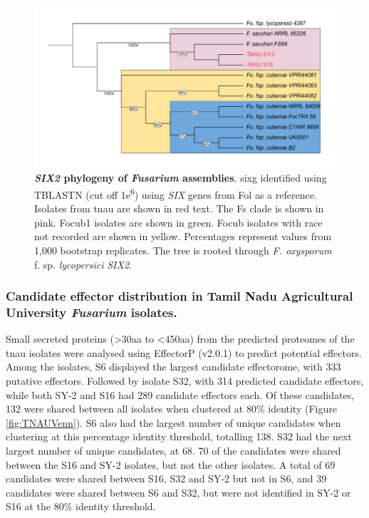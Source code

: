 \begin{figure}[htp!]
  \centering
  \includegraphics[width=15cm]{Figures/FusSIX2.Phylo.edited.pdf}
  \caption[\textit{SIX2} phylogeny of \textit{Fusarium} assemblies]{\textbf{\textit{SIX2} phylogeny of \textit{Fusarium} assemblies}. \acl{sixg} identified using TBLASTN (cut off 1\-e\textsuperscript{6}) using \textit{SIX} genes from \acl{Fol} as a reference. Isolates from \ac{tnau} are shown in red text. The \acl{Fs} clade is shown in pink. \Acl{Focub1} isolates are shown in green. \acl{Focub} isolates with race not recorded are shown in yellow. Percentages represent values from 1,000 bootstrap replicates. The tree is rooted through \textit{F. oxysporum} f. sp. \textit{lycopersici} \textit{SIX2}.}
  \label{fig:FusSIX2}
\end{figure}

\subsubsection{Candidate effector distribution in Tamil Nadu Agricultural University \textit{Fusarium} isolates.}

Small secreted proteins (>30aa to <450aa)  from the predicted proteomes of the \ac{tnau} isolates were analysed using EffectorP (v2.0.1) to predict potential effectors. Among the isolates, S6 displayed the largest candidate effectorome, with 333 putative effectors. Followed by isolate S32, with 314 predicted candidate effectors, while both SY-2 and S16 had 289 candidate effectors each. Of these candidates, 132 were shared between all isolates when clustered at 80\% identity (Figure \ref{fig:TNAUVenn}). S6 also had the largest number of unique candidates when clustering at this percentage identity threshold, totalling 138. S32 had the next largest number of unique candidates, at 68. 70 of the candidates were shared between the S16 and SY-2 isolates, but not the other isolates. A total of 69 candidates were shared between S16, S32 and SY-2 but  not  in S6, and 39 candidates were shared between S6 and S32, but were not identified in SY-2 or S16 at the  80\% identity threshold. 

